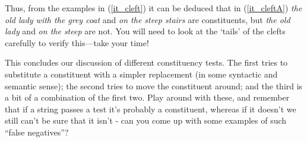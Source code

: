 \documentclass{article}
\begin{document}
Thus, from the examples in (\ref{it_cleft}) it can be deduced that in (\ref{it_cleftA}) \emph{the old lady with the grey coat} and \emph{on the steep stairs} are constituents, but \emph{the old lady} and \emph{on the steep} are not.
You will need to look at the `tails' of the clefts carefully to verify this---take your time!
\begin{exe}
    \label{it_cleft}
\end{exe}

This concludes our discussion of different constituency tests. The first tries to substitute a constituent with a simpler replacement (in some syntactic and semantic sense); the second tries to move the constituent around; and the third is a bit of a combination of the first two. Play around with these, and remember that if a string passes a test it's probably a constituent, whereas if it doesn't we still can't be sure that it isn't - can you come up with some examples of such ``false negatives''?
\end{document}
